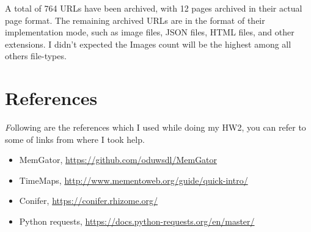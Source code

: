 \documentclass[12pt]{article}
\begin{document}
A total of 764 URLs have been archived, with 12 pages archived in their actual page format. The remaining archived URLs are in the format of their implementation mode, such as image files, JSON files, HTML files, and other extensions. I didn't expected the Images count will be the highest among all others file-types. 


\section*{References}
\emph Following are the references which I used while doing my HW2, you can refer to some of links from where I took help.

\begin{itemize}
    \item {MemGator, \url{https://github.com/oduwsdl/MemGator}}
    \item {TimeMaps, \url{http://www.mementoweb.org/guide/quick-intro/}}
    \item {Conifer, \url{https://conifer.rhizome.org/}}
    \item {Python requests, \url{https://docs.python-requests.org/en/master/}}
\end{itemize}
\end{document}
